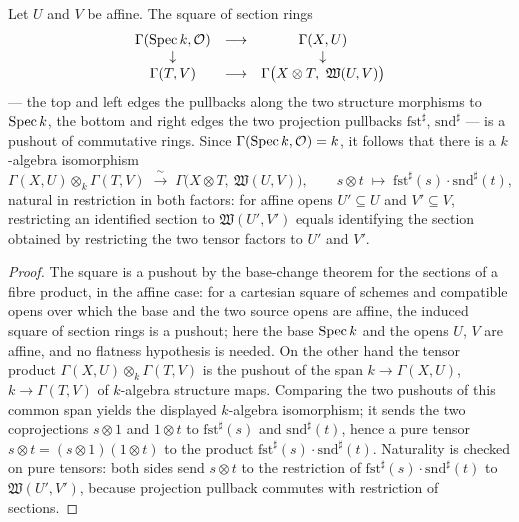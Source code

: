 \begin{definition}
  \label{pa-def:productChartSections}
  \leanok

  Let \(U\) and \(V\) be affine. The square of section rings
  \[
    \begin{array}{ccc}
      \Gamma(\Spec k, \struct{}) & \longrightarrow & \Gamma(X, U) \\
      \downarrow & & \downarrow \\
      \Gamma(T, V) & \longrightarrow & \Gamma\bigl(X \otimes T,\ \mathfrak W(U,V)\bigr)
    \end{array}
  \]
  --- the top and left edges the pullbacks along the two structure morphisms to \(\operatorname{Spec} k\), the
  bottom and right edges the two projection pullbacks \(\mathrm{fst}^\sharp\),
  \(\mathrm{snd}^\sharp\) --- is a pushout of commutative rings. Since
  \(\Gamma(\operatorname{Spec} k, \mathcal{O}_{}) = k\), it follows that there is a \(k\)-algebra isomorphism
  \[
    \Gamma(X, U) \otimes_k \Gamma(T, V) \;\xrightarrow{\ \sim\ }\;
      \Gamma\bigl(X \otimes T,\ \mathfrak W(U,V)\bigr), \qquad
      s \otimes t \;\longmapsto\; \mathrm{fst}^\sharp(s) \cdot \mathrm{snd}^\sharp(t),
  \]
  natural in restriction in both factors: for affine opens \(U' \subseteq U\) and
  \(V' \subseteq V\), restricting an identified section to \(\mathfrak W(U', V')\) equals
  identifying the section obtained by restricting the two tensor factors to \(U'\) and \(V'\).
\end{definition}
\begin{proof}
  \leanok
  The square is a pushout by the base-change theorem for the sections of a fibre product, in the
  affine case: for a cartesian square of schemes and compatible opens over which the base and the
  two source opens are affine, the induced square of section rings is a pushout; here the base
  \(\operatorname{Spec} k\) and the opens \(U\), \(V\) are affine, and no flatness hypothesis is needed. On the
  other hand the tensor product \(\Gamma(X,U) \otimes_k \Gamma(T,V)\) is the pushout of the span
  \(k \to \Gamma(X,U)\), \(k \to \Gamma(T,V)\) of \(k\)-algebra structure maps. Comparing the two
  pushouts of this common span yields the displayed \(k\)-algebra isomorphism; it sends the two
  coprojections \(s \otimes 1\) and \(1 \otimes t\) to \(\mathrm{fst}^\sharp(s)\) and
  \(\mathrm{snd}^\sharp(t)\), hence a pure tensor \(s \otimes t = (s \otimes 1)(1 \otimes t)\) to
  the product \(\mathrm{fst}^\sharp(s) \cdot \mathrm{snd}^\sharp(t)\). Naturality is checked on
  pure tensors: both sides send \(s \otimes t\) to the restriction of
  \(\mathrm{fst}^\sharp(s) \cdot \mathrm{snd}^\sharp(t)\) to \(\mathfrak W(U',V')\), because
  projection pullback commutes with restriction of sections.
\end{proof}

